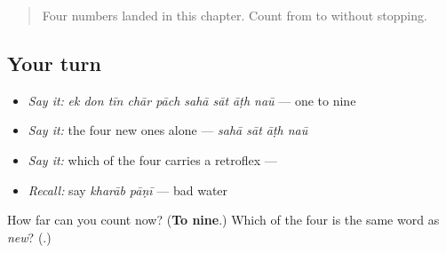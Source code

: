 \label{lesson:MR-R55-six-to-nine}



\begin{quote}
Four numbers landed in this chapter. Count from \textbf{} to \textbf{} without stopping.
\end{quote}

\subsection*{Your turn}
\begin{itemize}
\raggedright
  \item \emph{Say it:} \emph{ek don tīn chār pāch sahā sāt āṭh naū} — one to nine
  \item \emph{Say it:} the four new ones alone — \emph{sahā sāt āṭh naū}
  \item \emph{Say it:} which of the four carries a retroflex — \emph{\textbf{}}
  \item \emph{Recall:} say \emph{kharāb pāṇī} — bad water
\end{itemize}

\begin{tcolorbox}[breakable,colback=teal!4,colframe=teal!35!black,title={Before you move on}]
How far can you count now? (\textbf{To nine}.) Which of the four is the same word as \emph{new}? (\textbf{}.)
\end{tcolorbox}
